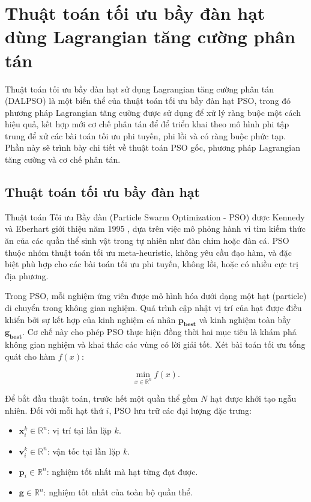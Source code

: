 \section{Thuật toán tối ưu bầy đàn hạt dùng Lagrangian tăng cường phân tán}
Thuật toán tối ưu bầy đàn hạt sử dụng Lagrangian tăng cường phân tán (DALPSO) là một biến thể của thuật toán tối ưu bầy đàn hạt PSO, trong đó phương pháp Lagrangian tăng cường được sử dụng để xử lý ràng buộc một cách hiệu quả, kết hợp mới cơ chế phân tán để để triển khai theo mô hình phi tập trung để xử các bài toán tối ưu phi tuyến, phi lồi và có ràng buộc phức tạp. Phần này sẽ trình bày chi tiết về thuật toán PSO gốc, phương pháp Lagrangian tăng cường và cơ chế phân tán.

\subsection{Thuật toán tối ưu bầy đàn hạt}
Thuật toán Tối ưu Bầy đàn (Particle Swarm Optimization - PSO) được Kennedy và Eberhart giới thiệu năm 1995 \cite{kennedy1995pso}, dựa trên việc mô phỏng hành vi tìm kiếm thức ăn của các quần thể sinh vật trong tự nhiên như đàn chim hoặc đàn cá. PSO thuộc nhóm thuật toán tối ưu meta-heuristic, không yêu cầu đạo hàm, và đặc biệt phù hợp cho các bài toán tối ưu phi tuyến, không lồi, hoặc có nhiều cực trị địa phương.

Trong PSO, mỗi nghiệm ứng viên được mô hình hóa dưới dạng một hạt (particle) di chuyển trong không gian nghiệm. Quá trình cập nhật vị trí của hạt được điều khiển bởi sự kết hợp của kinh nghiệm cá nhân $\mathbf{p_{\text{best}}}$ và kinh nghiệm toàn bầy $\mathbf{g_{\text{best}}}$. Cơ chế này cho phép PSO thực hiện đồng thời hai mục tiêu là khám phá không gian nghiệm và khai thác các vùng có lời giải tốt. Xét bài toán tối ưu tổng quát cho hàm $f(x)$:

\begin{equation}
    \min_{x \in \mathbb{R}^n} f(x).
\label{eq:fmin}
\end{equation}

Để bắt đầu thuật toán, trước hết một quần thể gồm \(N\) hạt được khởi tạo ngẫu nhiên. Đối với mỗi hạt thứ \(i\), PSO lưu trữ các đại lượng đặc trưng:
\begin{itemize}
    \item \(\mathbf{x}_i^k \in \mathbb{R}^n\): vị trí tại lần lặp \(k\).
    \item \(\mathbf{v}_i^k \in \mathbb{R}^n\): vận tốc tại lần lặp \(k\).
    \item \(\mathbf{p}_i \in \mathbb{R}^n\): nghiệm tốt nhất mà hạt từng đạt được.
    \item \(\mathbf{g} \in \mathbb{R}^n\): nghiệm tốt nhất của toàn bộ quần thể.
\end{itemize}

